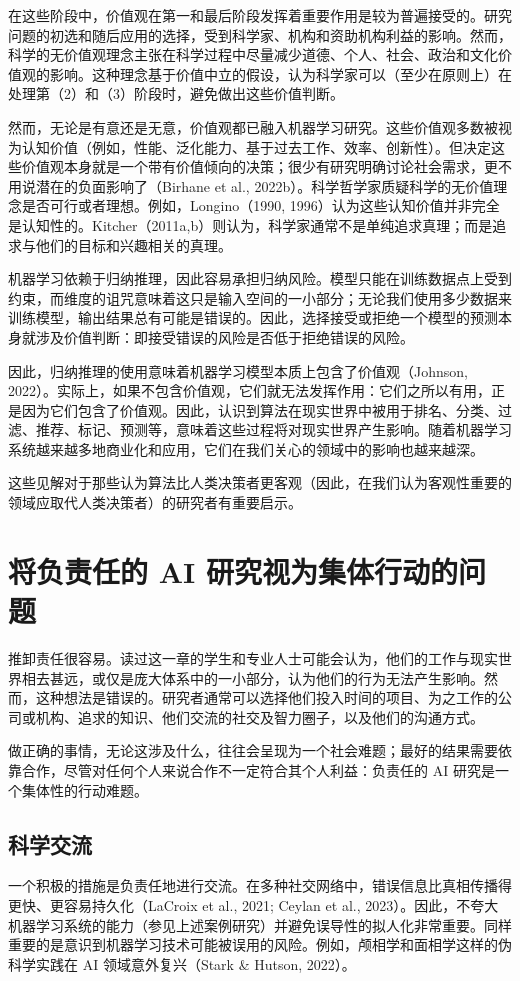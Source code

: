 \documentclass[lang=cn,newtx,10pt,scheme=chinese]{elegantbook}
\begin{document}
在这些阶段中，价值观在第一和最后阶段发挥着重要作用是较为普遍接受的。研究问题的初选和随后应用的选择，受到科学家、机构和资助机构利益的影响。然而，科学的无价值观理念主张在科学过程中尽量减少道德、个人、社会、政治和文化价值观的影响。这种理念基于价值中立的假设，认为科学家可以（至少在原则上）在处理第（2）和（3）阶段时，避免做出这些价值判断。

然而，无论是有意还是无意，价值观都已融入机器学习研究。这些价值观多数被视为认知价值（例如，性能、泛化能力、基于过去工作、效率、创新性）。但决定这些价值观本身就是一个带有价值倾向的决策；很少有研究明确讨论社会需求，更不用说潜在的负面影响了（Birhane et al., 2022b）。科学哲学家质疑科学的无价值理念是否可行或者理想。例如，Longino（1990, 1996）认为这些认知价值并非完全是认知性的。Kitcher（2011a,b）则认为，科学家通常不是单纯追求真理；而是追求与他们的目标和兴趣相关的真理。

机器学习依赖于归纳推理，因此容易承担归纳风险。模型只能在训练数据点上受到约束，而维度的诅咒意味着这只是输入空间的一小部分；无论我们使用多少数据来训练模型，输出结果总有可能是错误的。因此，选择接受或拒绝一个模型的预测本身就涉及价值判断：即接受错误的风险是否低于拒绝错误的风险。

因此，归纳推理的使用意味着机器学习模型本质上包含了价值观（Johnson, 2022）。实际上，如果不包含价值观，它们就无法发挥作用：它们之所以有用，正是因为它们包含了价值观。因此，认识到算法在现实世界中被用于排名、分类、过滤、推荐、标记、预测等，意味着这些过程将对现实世界产生影响。随着机器学习系统越来越多地商业化和应用，它们在我们关心的领域中的影响也越来越深。

这些见解对于那些认为算法比人类决策者更客观（因此，在我们认为客观性重要的领域应取代人类决策者）的研究者有重要启示。


\section{将负责任的 AI 研究视为集体行动的问题}
推卸责任很容易。读过这一章的学生和专业人士可能会认为，他们的工作与现实世界相去甚远，或仅是庞大体系中的一小部分，认为他们的行为无法产生影响。然而，这种想法是错误的。研究者通常可以选择他们投入时间的项目、为之工作的公司或机构、追求的知识、他们交流的社交及智力圈子，以及他们的沟通方式。

做正确的事情，无论这涉及什么，往往会呈现为一个社会难题；最好的结果需要依靠合作，尽管对任何个人来说合作不一定符合其个人利益：负责任的 AI 研究是一个集体性的行动难题。

\subsection{科学交流}
一个积极的措施是负责任地进行交流。在多种社交网络中，错误信息比真相传播得更快、更容易持久化（LaCroix et al., 2021; Ceylan et al., 2023）。因此，不夸大机器学习系统的能力（参见上述案例研究）并避免误导性的拟人化非常重要。同样重要的是意识到机器学习技术可能被误用的风险。例如，颅相学和面相学这样的伪科学实践在 AI 领域意外复兴（Stark \& Hutson, 2022）。
\end{document}
